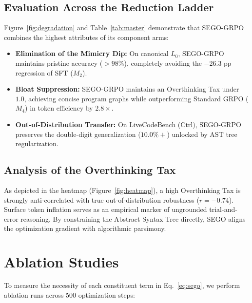 \documentclass[10pt,twocolumn,letterpaper]{article}
\begin{document}
\subsection{Evaluation Across the Reduction Ladder}
Figure~\ref{fig:degradation} and Table~\ref{tab:master} demonstrate that SEGO-GRPO combines the highest attributes of its component arms:
\begin{itemize}[leftmargin=*]
    \item \textbf{Elimination of the Mimicry Dip:} On canonical $L_0$, SEGO-GRPO maintains pristine accuracy ($>98\%$), completely avoiding the $-26.3$ pp regression of SFT ($M_2$).
    \item \textbf{Bloat Suppression:} SEGO-GRPO maintains an Overthinking Tax under $1.0$, achieving concise program graphs while outperforming Standard GRPO ($M_4$) in token efficiency by $2.8\times$.
    \item \textbf{Out-of-Distribution Transfer:} On LiveCodeBench (Ctrl), SEGO-GRPO preserves the double-digit generalization ($10.0\%+$) unlocked by AST tree regularization.
\end{itemize}

\subsection{Analysis of the Overthinking Tax}
As depicted in the heatmap (Figure~\ref{fig:heatmap}), a high Overthinking Tax is strongly anti-correlated with true out-of-distribution robustness ($r = -0.74$). Surface token inflation serves as an empirical marker of ungrounded trial-and-error reasoning. By constraining the Abstract Syntax Tree directly, SEGO aligns the optimization gradient with algorithmic parsimony.

\section{Ablation Studies}
\label{sec:ablations}

To measure the necessity of each constituent term in Eq.~\eqref{eq:sego}, we perform ablation runs across 500 optimization steps:
\end{document}
